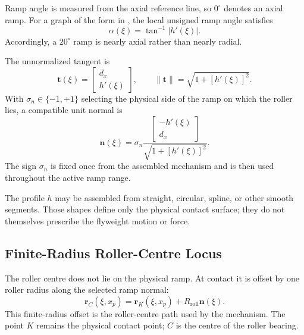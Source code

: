 \documentclass[11pt]{report}
\numberwithin{equation}{section}
\begin{document}
Ramp angle is measured from the axial reference line, so \(0^\circ\) denotes an
axial ramp. For a graph of the form in , the local
unsigned ramp angle satisfies
\begin{equation}
    \alpha(\xi)=\tan^{-1}|h'(\xi)|.
\end{equation}
Accordingly, a \(20^\circ\) ramp is nearly axial rather than nearly radial.

The unnormalized tangent is
\begin{equation}
    \bm t(\xi)
    =
    \begin{bmatrix}
        d_x\\
        h'(\xi)
    \end{bmatrix},
    \qquad
    \|\bm t\|=\sqrt{1+[h'(\xi)]^2}.
    \label{eq:appB_ramp_tangent}
\end{equation}
With \(\sigma_n\in\{-1,+1\}\) selecting the physical side of the ramp on which
the roller lies, a compatible unit normal is
\begin{equation}
    \boxed{
    \bm n(\xi)
    =
    \sigma_n
    \frac{
        \begin{bmatrix}
            -h'(\xi)\\
            d_x
        \end{bmatrix}
    }{
        \sqrt{1+[h'(\xi)]^2}
    }.
    }
    \label{eq:appB_ramp_normal}
\end{equation}
The sign \(\sigma_n\) is fixed once from the assembled mechanism and is then
used throughout the active ramp range.

The profile \(h\) may be assembled from straight, circular, spline, or other
smooth segments. Those shapes define only the physical contact surface; they do
not themselves prescribe the flyweight motion or force.

\subsection{Finite-Radius Roller-Centre Locus}
\label{app:flyweight_offset_curve}

The roller centre does not lie on the physical ramp. At contact it is offset by
one roller radius along the selected ramp normal:
\begin{equation}
    \boxed{
    \bm r_C(\xi,x_p)
    =
    \bm r_K(\xi,x_p)
    +
    R_{\mathrm{roll}}\bm n(\xi).
    }
    \label{eq:appB_offset_curve}
\end{equation}
This finite-radius offset is the roller-centre path used by the mechanism. The
point \(K\) remains the physical contact point; \(C\) is the centre of the
roller bearing.
\end{document}
